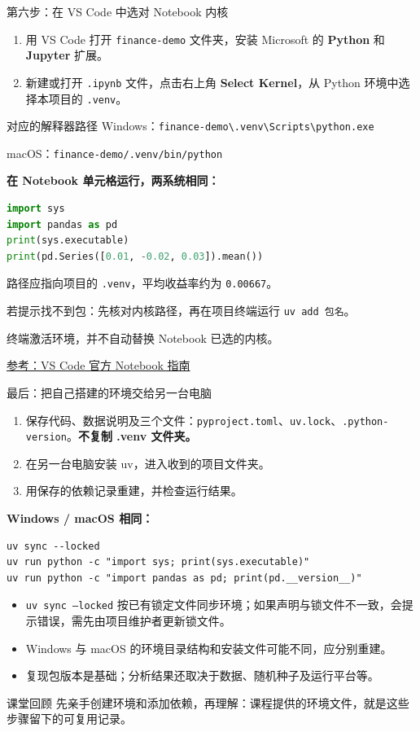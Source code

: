 \documentclass[9pt]{ctexbeamer}
\begin{document}
\begin{frame}[fragile]{第六步：在 VS Code 中选对 Notebook 内核}
  \begin{enumerate}
    \item 用 VS Code 打开 \texttt{finance-demo} 文件夹，安装 Microsoft 的 \textbf{Python} 和 \textbf{Jupyter} 扩展。
    \item 新建或打开 \texttt{.ipynb} 文件，点击右上角 \textbf{Select Kernel}，从 Python 环境中选择本项目的 \texttt{.venv}。
  \end{enumerate}
  \begin{block}{对应的解释器路径}
    Windows：\texttt{finance-demo\textbackslash .venv\textbackslash Scripts\textbackslash python.exe}\par
    macOS：\texttt{finance-demo/.venv/bin/python}
  \end{block}
  \textbf{在 Notebook 单元格运行，两系统相同：}
\begin{lstlisting}[language=Python,numbers=none]
import sys
import pandas as pd
print(sys.executable)
print(pd.Series([0.01, -0.02, 0.03]).mean())
\end{lstlisting}
  {\small 路径应指向项目的 \texttt{.venv}，平均收益率约为 \texttt{0.00667}。\par
  若提示找不到包：先核对内核路径，再在项目终端运行 \texttt{uv add 包名}。\par
  终端激活环境，并不自动替换 Notebook 已选的内核。}
  \par{\tiny\href{https://code.visualstudio.com/docs/datascience/jupyter-notebooks}{参考：VS Code 官方 Notebook 指南}}
\end{frame}

\begin{frame}[fragile]{最后：把自己搭建的环境交给另一台电脑}
  \begin{enumerate}
    \item 保存代码、数据说明及三个文件：\texttt{pyproject.toml}、\texttt{uv.lock}、\texttt{.python-version}。\textbf{不复制 .venv 文件夹。}
    \item 在另一台电脑安装 uv，进入收到的项目文件夹。
    \item 用保存的依赖记录重建，并检查运行结果。
  \end{enumerate}
  \textbf{Windows / macOS 相同：}
\begin{lstlisting}[language={},numbers=none]
uv sync --locked
uv run python -c "import sys; print(sys.executable)"
uv run python -c "import pandas as pd; print(pd.__version__)"
\end{lstlisting}
  \begin{itemize}
    \item \texttt{uv sync --locked} 按已有锁定文件同步环境；如果声明与锁文件不一致，会提示错误，需先由项目维护者更新锁文件。
    \item Windows 与 macOS 的环境目录结构和安装文件可能不同，应分别重建。
    \item 复现包版本是基础；分析结果还取决于数据、随机种子及运行平台等。
  \end{itemize}
  \begin{block}{课堂回顾}
    先亲手创建环境和添加依赖，再理解：课程提供的环境文件，就是这些步骤留下的可复用记录。
  \end{block}
\end{frame}
\end{document}
